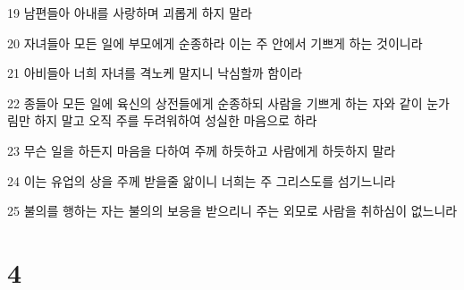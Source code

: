 \par 19 남편들아 아내를 사랑하며 괴롭게 하지 말라
\par 20 자녀들아 모든 일에 부모에게 순종하라 이는 주 안에서 기쁘게 하는 것이니라
\par 21 아비들아 너희 자녀를 격노케 말지니 낙심할까 함이라
\par 22 종들아 모든 일에 육신의 상전들에게 순종하되 사람을 기쁘게 하는 자와 같이 눈가림만 하지 말고 오직 주를 두려워하여 성실한 마음으로 하라
\par 23 무슨 일을 하든지 마음을 다하여 주께 하듯하고 사람에게 하듯하지 말라
\par 24 이는 유업의 상을 주께 받을줄 앎이니 너희는 주 그리스도를 섬기느니라
\par 25 불의를 행하는 자는 불의의 보응을 받으리니 주는 외모로 사람을 취하심이 없느니라

\chapter{4}

